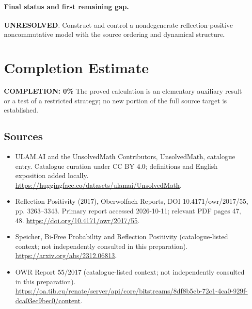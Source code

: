 \documentclass[11pt]{article}
\begin{document}
\paragraph{Final status and first remaining gap.}
\textbf{UNRESOLVED}. Construct and control a nondegenerate reflection-positive noncommutative model with the source ordering and dynamical structure.

\section{Completion Estimate}
\noindent\textbf{COMPLETION: 0\%}
The proved calculation is an elementary auxiliary result or a test of a restricted strategy; no new portion of the full source target is established.

\subsection{Sources}
\begin{itemize}
\item[\hypertarget{source:statement:1}{S1}] ULAM.AI and the UnsolvedMath Contributors, UnsolvedMath, catalogue entry. Catalogue curation under CC BY 4.0; definitions and English exposition added locally.
\url{https://huggingface.co/datasets/ulamai/UnsolvedMath}.
\item[\hypertarget{source:statement:2}{S2}] Reflection Positivity (2017), Oberwolfach Reports, DOI 10.4171/owr/2017/55, pp. 3263--3343. Primary report accessed 2026-10-11; relevant PDF pages 47, 48.
\url{https://doi.org/10.4171/owr/2017/55}.
\item[\hypertarget{source:statement:3}{S3}] Speicher, Bi-Free Probability and Reflection Positivity (catalogue-listed context; not independently consulted in this preparation).
\url{https://arxiv.org/abs/2312.06813}.
\item[\hypertarget{source:statement:4}{S4}] OWR Report 55/2017 (catalogue-listed context; not independently consulted in this preparation).
\url{https://oa.tib.eu/renate/server/api/core/bitstreams/8df8b5cb-72c1-4ca0-929f-dca03ec9bec0/content}.
\end{itemize}
\label{end:statement}
\end{document}
